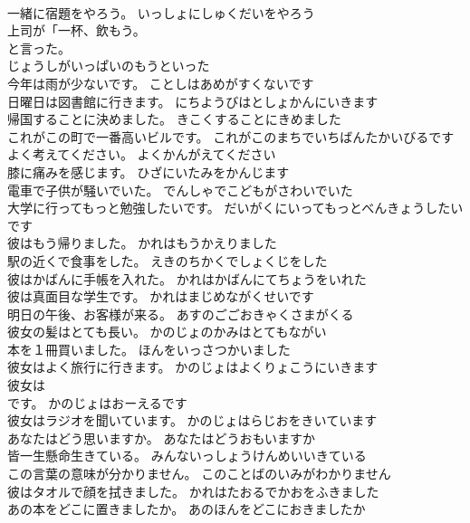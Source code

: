 \documentclass[8pt]{extreport}
\begin{document}
\begin{CJK}{UTF8}{min}
\\	一緒に宿題をやろう。	いっしょにしゅくだいをやろう 
\\	上司が「一杯、飲もう。	
\\	と言った。 
\\	じょうしがいっぱいのもうといった
\\	今年は雨が少ないです。	ことしはあめがすくないです 
\\	日曜日は図書館に行きます。	にちようびはとしょかんにいきます 
\\	帰国することに決めました。	きこくすることにきめました 
\\	これがこの町で一番高いビルです。	これがこのまちでいちばんたかいびるです 
\\	よく考えてください。	よくかんがえてください 
\\	膝に痛みを感じます。	ひざにいたみをかんじます 
\\	電車で子供が騒いでいた。	でんしゃでこどもがさわいでいた 
\\	大学に行ってもっと勉強したいです。	だいがくにいってもっとべんきょうしたいです 
\\	彼はもう帰りました。	かれはもうかえりました 
\\	駅の近くで食事をした。	えきのちかくでしょくじをした 
\\	彼はかばんに手帳を入れた。	かれはかばんにてちょうをいれた 
\\	彼は真面目な学生です。	かれはまじめながくせいです 
\\	明日の午後、お客様が来る。	あすのごごおきゃくさまがくる 
\\	彼女の髪はとても長い。	かのじょのかみはとてもながい 
\\	本を１冊買いました。	ほんをいっさつかいました 
\\	彼女はよく旅行に行きます。	かのじょはよくりょこうにいきます 
\\	彼女は
\\	です。	かのじょはおーえるです 
\\	彼女はラジオを聞いています。	かのじょはらじおをきいています 
\\	あなたはどう思いますか。	あなたはどうおもいますか 
\\	皆一生懸命生きている。	みんないっしょうけんめいいきている 
\\	この言葉の意味が分かりません。	このことばのいみがわかりません 
\\	彼はタオルで顔を拭きました。	かれはたおるでかおをふきました 
\\	あの本をどこに置きましたか。	あのほんをどこにおきましたか 

\end{CJK}
\end{document}
